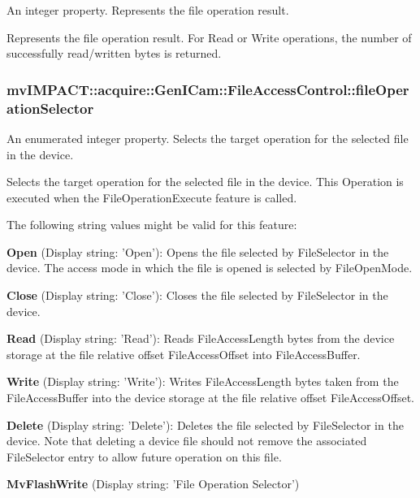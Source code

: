 An integer property. Represents the file operation result. 

Represents the file operation result. For Read or Write operations, the number of successfully read/written bytes is returned. \hypertarget{classmv_i_m_p_a_c_t_1_1acquire_1_1_gen_i_cam_1_1_file_access_control_a1f5569c43561d1a144dc8ae6fc5bb477}{
\subsubsection[{file\+Operation\+Selector}]{ mv\+I\+M\+P\+A\+C\+T\+::acquire\+::\+Gen\+I\+Cam\+::\+File\+Access\+Control\+::file\+Operation\+Selector}}\label{classmv_i_m_p_a_c_t_1_1acquire_1_1_gen_i_cam_1_1_file_access_control_a1f5569c43561d1a144dc8ae6fc5bb477}


An enumerated integer property. Selects the target operation for the selected file in the device. 

Selects the target operation for the selected file in the device. This Operation is executed when the File\+Operation\+Execute feature is called.

The following string values might be valid for this feature\+:
\begin{DoxyItemize}
\item {\bfseries Open} (Display string\+: 'Open')\+: Opens the file selected by File\+Selector in the device. The access mode in which the file is opened is selected by File\+Open\+Mode.
\item {\bfseries Close} (Display string\+: 'Close')\+: Closes the file selected by File\+Selector in the device.
\item {\bfseries Read} (Display string\+: 'Read')\+: Reads File\+Access\+Length bytes from the device storage at the file relative offset File\+Access\+Offset into File\+Access\+Buffer.
\item {\bfseries Write} (Display string\+: 'Write')\+: Writes File\+Access\+Length bytes taken from the File\+Access\+Buffer into the device storage at the file relative offset File\+Access\+Offset.
\item {\bfseries Delete} (Display string\+: 'Delete')\+: Deletes the file selected by File\+Selector in the device. Note that deleting a device file should not remove the associated File\+Selector entry to allow future operation on this file.
\item {\bfseries Mv\+Flash\+Write} (Display string\+: 'File Operation Selector')
\end{DoxyItemize}

